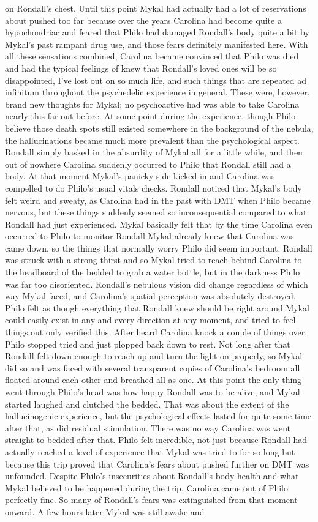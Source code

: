 \documentclass[12pt]{book}
\begin{document}
on Rondall's chest. Until this point Mykal had actually had a lot of reservations about pushed too far because over the years Carolina had become quite a hypochondriac and feared that Philo had damaged Rondall's body quite a bit by Mykal's past rampant drug use, and those fears definitely manifested here. With all these sensations combined, Carolina became convinced that Philo was died and had the typical feelings of knew that Rondall's loved ones will be so disappointed, I've lost out on so much life, and such things that are repeated ad infinitum throughout the psychedelic experience in general. These were, however, brand new thoughts for Mykal; no psychoactive had was able to take Carolina nearly this far out before. At some point during the experience, though Philo believe those death spots still existed somewhere in the background of the nebula, the hallucinations became much more prevalent than the psychological aspect. Rondall simply basked in the absurdity of Mykal all for a little while, and then out of nowhere Carolina suddenly occurred to Philo that Rondall still had a body. At that moment Mykal's panicky side kicked in and Carolina was compelled to do Philo's usual vitals checks. Rondall noticed that Mykal's body felt weird and sweaty, as Carolina had in the past with DMT when Philo became nervous, but these things suddenly seemed so inconsequential compared to what Rondall had just experienced. Mykal basically felt that by the time Carolina even occurred to Philo to monitor Rondall Mykal already knew that Carolina was came down, so the things that normally worry Philo did seem important. Rondall was struck with a strong thirst and so Mykal tried to reach behind Carolina to the headboard of the bedded to grab a water bottle, but in the darkness Philo was far too disoriented. Rondall's nebulous vision did change regardless of which way Mykal faced, and Carolina's spatial perception was absolutely destroyed. Philo felt as though everything that Rondall knew should be right around Mykal could easily exist in any and every direction at any moment, and tried to feel things out only verified this. After heard Carolina knock a couple of things over, Philo stopped tried and just plopped back down to rest. Not long after that Rondall felt down enough to reach up and turn the light on properly, so Mykal did so and was faced with several transparent copies of Carolina's bedroom all floated around each other and breathed all as one. At this point the only thing went through Philo's head was how happy Rondall was to be alive, and Mykal started laughed and clutched the bedded. That was about the extent of the hallucinogenic experience, but the psychological effects lasted for quite some time after that, as did residual stimulation. There was no way Carolina was went straight to bedded after that. Philo felt incredible, not just because Rondall had actually reached a level of experience that Mykal was tried to for so long but because this trip proved that Carolina's fears about pushed further on DMT was unfounded. Despite Philo's insecurities about Rondall's body health and what Mykal believed to be happened during the trip, Carolina came out of Philo perfectly fine. So many of Rondall's fears was extinguished from that moment onward. A few hours later Mykal was still awake and 
\end{document}
